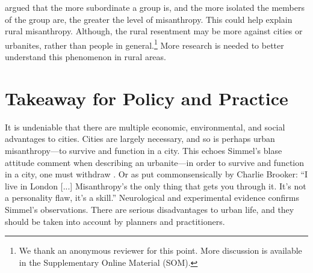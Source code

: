 \documentclass[11pt, letterpaper]{article}
\begin{document}
\begin{spacing}{1.4}
{
\citet{smith97} argued that the more subordinate a group is, and the more
isolated the members of the group are, the greater the level of misanthropy. %
 This could help explain rural misanthropy.  Although, the rural resentment may be more against cities or urbanites, rather than people in general.\footnote{We thank an anonymous reviewer for this point. More discussion is available in the Supplementary Online Material (SOM).}%
  More research is needed to better understand this phenomenon in rural areas. %
}

\section*{Takeaway for Policy and Practice}

It is undeniable that there are multiple economic, environmental, and social
advantages to cities. 
 Cities are largely necessary, and so is perhaps urban misanthropy---to survive and function in a city. This echoes Simmel's blase attitude comment when describing an urbanite---in order to survive and function in a city, one must withdraw \citep{simmel03}. Or as put commonsensically by Charlie Brooker:
 ``I live in London [...] Misanthropy's the only thing that gets you
  through it. It's not a personality flaw, it's a skill.''
 Neurological \citep{lederbogen11} and experimental \citep{milgram70} evidence  confirms Simmel's observations. 
 There are serious disadvantages to urban life, and they should be taken into account by planners and practitioners. 
 

\end{spacing}
\end{document}
